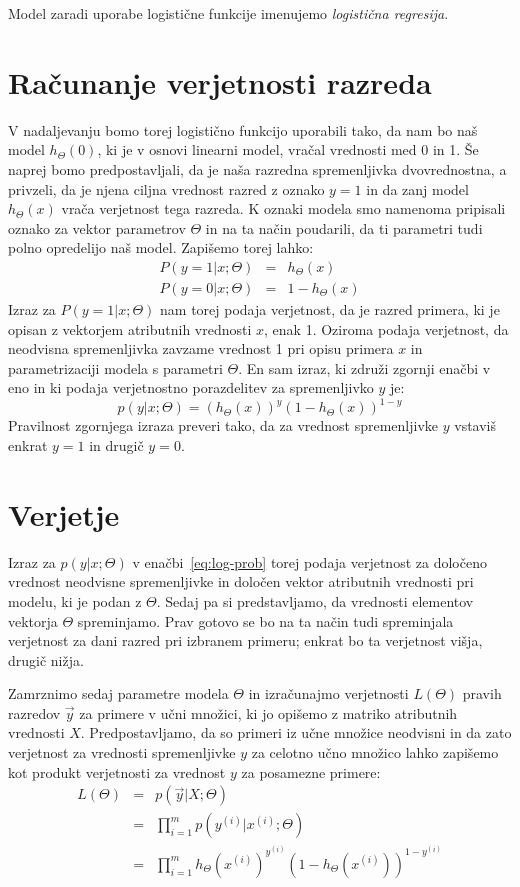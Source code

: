 Model zaradi uporabe logistične funkcije imenujemo {\em logistična regresija}.

\section{Računanje verjetnosti razreda}

V nadaljevanju bomo torej logistično funkcijo uporabili tako, da nam bo naš model $h_{\Theta}(0)$, ki je v osnovi linearni model, vračal vrednosti med 0 in 1. Še naprej bomo predpostavljali, da je naša razredna spremenljivka dvovrednostna, a privzeli, da je njena ciljna vrednost razred z oznako $y=1$ in da zanj model $h_{\Theta}(x)$ vrača verjetnost tega razreda. K oznaki modela smo namenoma pripisali oznako za vektor parametrov $\Theta$ in na ta način poudarili, da ti parametri tudi polno opredelijo naš model. Zapišemo torej lahko:
\begin{eqnarray}
  P(y=1|x;\Theta) & = & h_\Theta(x) \\
  P(y=0|x;\Theta) & = & 1-h_\Theta(x)
\end{eqnarray}
Izraz za $P(y=1|x;\Theta)$ nam torej podaja verjetnost, da je razred primera, ki je opisan z vektorjem atributnih vrednosti $x$, enak 1. Oziroma podaja verjetnost, da neodvisna spremenljivka zavzame vrednost 1 pri opisu primera $x$ in parametrizaciji modela s parametri $\Theta$. En sam izraz, ki združi zgornji enačbi v eno in ki podaja verjetnostno porazdelitev za spremenljivko $y$ je:
\begin{equation}
  p(y|x;\Theta) = (h_\Theta(x))^y(1-h_\Theta(x))^{1-y}
\label{eq:log-prob}
\end{equation}
Pravilnost zgornjega izraza preveri tako, da za vrednost spremenljivke $y$ vstaviš enkrat $y=1$ in drugič $y=0$.

\section{Verjetje}

Izraz za $p(y|x;\Theta)$ v enačbi~\ref{eq:log-prob} torej podaja verjetnost za določeno vrednost neodvisne spremenljivke in določen vektor atributnih vrednosti pri modelu, ki je podan z $\Theta$. Sedaj pa si predstavljamo, da vrednosti elementov vektorja $\Theta$ spreminjamo. Prav gotovo se bo na ta način tudi spreminjala verjetnost za dani razred pri izbranem primeru; enkrat bo ta verjetnost višja, drugič nižja.

Zamrznimo sedaj parametre modela $\Theta$ in izračunajmo verjetnosti $L(\Theta)$ pravih razredov $\vec{y}$ za primere v učni množici, ki jo opišemo z matriko atributnih vrednosti $X$. Predpostavljamo, da so primeri iz učne množice neodvisni in da zato verjetnost za vrednosti spremenljivke $y$ za celotno učno množico lahko zapišemo kot produkt verjetnosti za vrednost $y$ za posamezne primere:
\begin{eqnarray}
  L(\Theta) & = & p(\vec{y}|X;\Theta) \nonumber\\
  & = & \prod_{i=1}^m p(y^{(i)}|x^{(i)};\Theta) \nonumber\\
  & = & \prod_{i=1}^m h_\Theta(x^{(i)})^{y^{(i)}}(1-h_\Theta(x^{(i)}))^{1-y^{(i)}}
\end{eqnarray}

